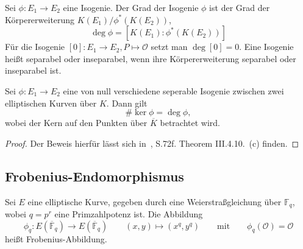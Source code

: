 \begin{definition}
    Sei $\phi:E_1\to E_2$ eine Isogenie. Der Grad der Isogenie $\phi$ ist der Grad der Körpererweiterung \(K(E_1)/\phi^*(K(E_2))\),
    \[
        \deg\phi=[K(E_1):\phi^*(K(E_2))]
    \]
    Für die Isogenie \([0]:E_1\to E_2,P\mapsto\mathcal{O}\) setzt man $\deg[0]=0$. Eine Isogenie heißt separabel oder inseparabel, wenn ihre Körpererweiterung separabel oder inseparabel ist.
\end{definition}

\begin{lemma}\label{lem:deg-isogenien}
    Sei $\phi:E_1\to E_2$ eine von null verschiedene seperable Isogenie zwischen zwei elliptischen Kurven über $K$. Dann gilt
    \[
        \#\ker \phi = \deg \phi,
    \]
    wobei der Kern auf den Punkten über $\overline{K}$ betrachtet wird.
\end{lemma}

\begin{proof}
    Der Beweis hierfür lässt sich in~\cite{silverman09}, S.72f.  Theorem III.4.10.~(c) finden.
\end{proof}

\subsection{Frobenius-Endomorphismus}
\begin{definition}\label{def:frobenius}
    Sei $E$ eine elliptische Kurve, gegeben durch eine
    Weierstraßgleichung über $\mathbb F_q$, wobei
    $q=p^r$ eine Primzahlpotenz ist. Die Abbildung
    \[
        \phi_q:E(\overline{\mathbb F}_q)\to E(\overline{\mathbb F}_q)\qquad
        (x,y)\mapsto(x^q,y^q)\qquad\text{mit}\qquad\phi_q(\mathcal O)=\mathcal O
    \]
    heißt Frobenius-Abbildung.
\end{definition}

